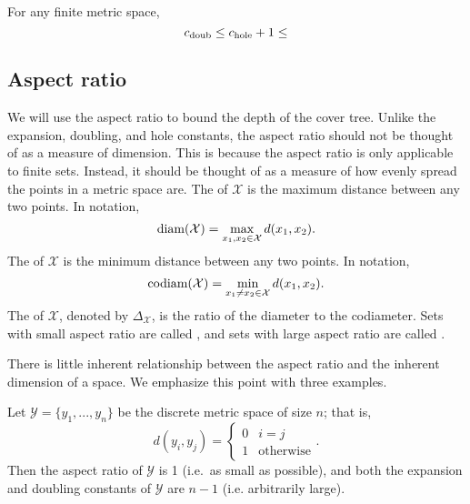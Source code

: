 \documentclass[thesis.tex]{subfiles}
\newcommand{\set}[1]{\mathcal {#1}}
\newcommand{\dist}[2]{\distf({#1},{#2})}
\newcommand{\distf}{d}
\newcommand{\diam}[1]{\textnormal{diam}({#1})}
\newcommand{\codiam}[1]{\textnormal{codiam}({#1})}
\newcommand{\aspect}[1]{\Delta_{#1}}
\newcommand{\cdoub}{c_\textnormal{doub}}
\newcommand{\chole}{c_\textnormal{hole}}
\begin{document}
\begin{lemma}
    \label{lemma:chole}
    For any finite metric space,
    \begin{equation}
        \cdoub \le \chole + 1 \le 
    \end{equation}
\end{lemma}

\fixme{}


\subsection{Aspect ratio}

We will use the aspect ratio to bound the depth of the cover tree.
Unlike the expansion, doubling, and hole constants,
the aspect ratio should not be thought of as a measure of dimension.
This is because the aspect ratio is only applicable to finite sets.
Instead, it should be thought of as a measure of how evenly spread the points in a metric space are.
The  of $\set X$ is the maximum distance between any two points.
In notation,
\begin{equation}
    \diam {\set X} = \max_{x_1,x_2\in\set X} \dist{x_1}{x_2}
    .
\end{equation}
The  of $\set X$ is the minimum distance between any two points.
In notation,
\begin{equation}
    \codiam {\set X} = \min_{x_1 \ne x_2\in\set X} \dist{x_1}{x_2}
    .
\end{equation}
The  of $\set X$, denoted by $\aspect{\set X}$, 
is the ratio of the diameter to the codiameter.
Sets with small aspect ratio are called ,
and sets with large aspect ratio are called .

There is little inherent relationship between the aspect ratio and the inherent dimension of a space.
We emphasize this point with three examples.

\begin{example}
    Let $\set Y=\{y_1,...,y_n\}$ be the discrete metric space of size $n$;
    that is,
    \begin{equation}
        \dist{y_i}{y_j}=
        \begin{cases}
            0 & i = j \\
            1 & \text{otherwise}
        \end{cases}
        .
    \end{equation}
    Then the aspect ratio of $\set Y$ is 1 (i.e.\ as small as possible),
    and both the expansion and doubling constants of $\set Y$ are $n-1$ (i.e. arbitrarily large).
\end{example}
\end{document}
